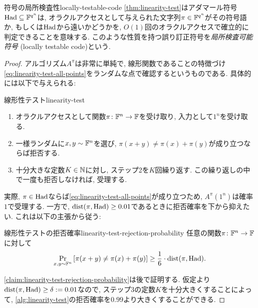 \begin{remark}{符号の局所検査性}{locally-testable-code}
  \cref{thm:linearity-test}はアダマール符号$\mathrm{Had}\subseteq\mathbb{F}^{q^n}$は, オラクルアクセスとして与えられた文字列$\pi\in\mathbb{F}^{q^n}$がその符号語か, もしくは$\mathrm{Had}$から遠いかどうかを, $O(1)$回のオラクルアクセスで確立的に判定できることを意味する.
  このような性質を持つ誤り訂正符号を\emph{局所検査可能符号} (locally testable code)という.
\end{remark}
\begin{proof}
  アルゴリズム$A^\pi$は非常に単純で, 線形関数であることの特徴づけ\cref{eq:linearity-test-all-points}をランダムな点で確認するというものである.
  具体的には以下で与えられる:
  \begin{algorithm}{線形性テスト}{linearity-test}
    \begin{enumerate}
      \item オラクルアクセスとして関数$\pi\colon \mathbb{F}^n\to\mathbb{F}$を受け取り, 入力として$1^n$を受け取る.
      \item 一様ランダムに$x,y\sim\mathbb{F}^n$を選び, $\pi(x+y)\ne \pi(x)+\pi(y)$が成り立つならば拒否する.
      \item 十分大きな定数$K\in\mathbb{N}$に対し, ステップ2を$K$回繰り返す. この繰り返しの中で一度も拒否しなければ, 受理する.
    \end{enumerate}
  \end{algorithm}

  実際, $\pi\in\mathrm{Had}$ならば\cref{eq:linearity-test-all-points}が成り立つため, $A^\pi(1^n)$は確率$1$で受理する.
  一方で, $\mathrm{dist}(\pi,\mathrm{Had})\ge 0.01$であるときに拒否確率を下から抑えたい.
  これは以下の主張から従う:

  \begin{claim}{線形性テストの拒否確率}{linearity-test-rejection-probability}
    任意の関数$\pi\colon \mathbb{F}^n\to\mathbb{F}$に対して
    \begin{align*}
      \Pr_{x,y\sim\mathbb{F}^n}\qty[ \pi(x+y) \ne \pi(x)+\pi(y) ] \ge \frac{1}{6}\cdot \mathrm{dist}(\pi,\mathrm{Had}).
    \end{align*}  
  \end{claim}

  \cref{claim:linearity-test-rejection-probability}は後で証明する.
  仮定より$\mathrm{dist}(\pi,\mathrm{Had})\ge \delta:=0.01$なので,
  ステップ3の定数$K$を十分大きくすることによって, \cref{alg:linearity-test}の拒否確率を$0.99$より大きくすることができる.
  \end{proof}

